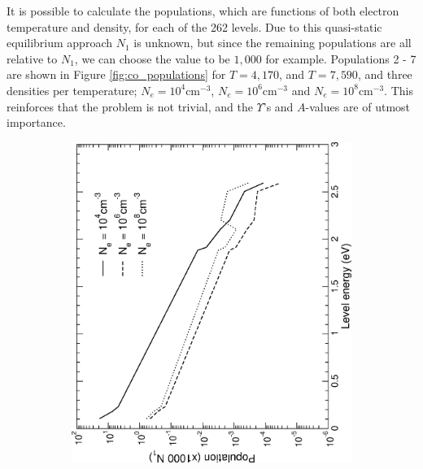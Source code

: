 It is possible to calculate the populations, which are functions of both electron temperature and density, for each of the 262 levels. Due to this quasi-static equilibrium approach $N_1$ is unknown, but since the remaining populations are all relative to $N_1$, we can choose the value to be $1,000$ for example. Populations 2 - 7 are shown in Figure \ref{fig:co_populations} for $T=4,170$, and $T=7,590$, and three densities per temperature; $N_e = 10^4$cm$^{-3}$, $N_e = 10^6$cm$^{-3}$ and $N_e = 10^8$cm$^{-3}$. This reinforces that the problem is not trivial, and the $\Upsilon$'s and $A$-values are of utmost importance.

%
\begin{figure}
\centering
\begin{subfigure}{0.45\textwidth}
\includegraphics[scale=0.48, angle=-90]{Figures/Cobalt/modelling/populations/population1.eps}    \end{subfigure}
    ~ %
    \begin{subfigure}{0.45\textwidth}

\end{subfigure}
\end{figure}
